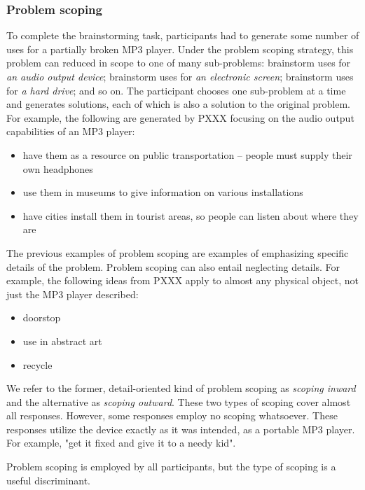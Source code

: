 \subsubsection{Problem scoping}

To complete the brainstorming task, participants had to generate some number of uses for a partially broken MP3 player. Under the problem scoping strategy, this problem can reduced in scope to one of many sub-problems: brainstorm uses for \emph{an audio output device}; brainstorm uses for \emph{an electronic screen}; brainstorm uses for \emph{a hard drive}; and so on. The participant chooses one sub-problem at a time and generates solutions, each of which is also a solution to the original problem. For example, the following are generated by PXXX focusing on the audio output capabilities of an MP3 player:

\begin{itemize}
    \item have them as a resource on public transportation -- people must supply their own headphones
    \item use them in museums to give information on various installations
    \item have cities install them in tourist areas, so people can listen about where they are
\end{itemize}

The previous examples of problem scoping are examples of emphasizing specific details of the problem. Problem scoping can also entail neglecting details. For example, the following ideas from PXXX apply to almost any physical object, not just the MP3 player described:

\begin{itemize}
    \item doorstop
    \item use in abstract art
    \item recycle
\end{itemize}

We refer to the former, detail-oriented kind of problem scoping as \emph{scoping inward} and the alternative as \emph{scoping outward}. These two types of scoping cover almost all responses. However, some responses employ no scoping whatsoever. These responses utilize the device exactly as it was intended, as a portable MP3 player. For example, "get it fixed and give it to a needy kid".

Problem scoping is employed by all participants, but the type of scoping is a useful discriminant.

